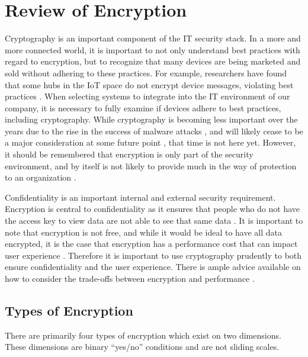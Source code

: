 \section{Review of Encryption}

Cryptography is an important component of the IT security stack. In a more and more connected world, it is important to not only understand best practices with regard to encryption, but to recognize that many devices are being marketed and sold without adhering to these practices. For example, researchers have found that some hubs in the IoT space do not encrypt device messages, violating best practices \parencite{momenzadehBestPracticesWould2020}. When selecting systems to integrate into the IT environment of our company, it is necessary to fully examine if devices adhere to best practices, including cryptography.  While cryptography is becoming less important over the years due to the rise in the success of malware attacks \parencite{greenCryptographyMayNot2014}, and will likely cease to be a major consideration at some future point \parencite{leydenPreparePostcryptoWorld,leetaruEncryptionDebateDead2019}, that time is not here yet. However, it should be remembered that encryption is only part of the security environment, and by itself is not likely to provide much in the way of protection to an organization \parencite{dingmanPosterAbstractGood2018}.

Confidentiality is an important internal and external security requirement. Encryption is central to confidentiality as it ensures that people who do not have the access key to view data are not able to see that same data \parencite{xuStrongLeakageresilientEncryption2021}. It is important to note that encryption is not free, and while it would be ideal to have all data encrypted, it is the case that encryption has a performance cost that can impact user experience \parencite{fujdiakModelingTradeoffSecurity2019}. Therefore it is important to use cryptography prudently to both ensure confidentiality and the user experience. There is ample advice available on how to consider the trade-offs between encryption and performance \parencite{martinEncryptionWonAffect}.

\subsection{Types of Encryption}

There are primarily four types of encryption which exist on two dimensions. These dimensions are binary ``yes/no'' conditions and are not sliding scales.

